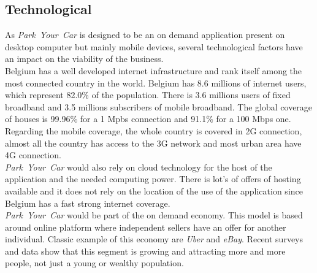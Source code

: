 \documentclass[12pt,a4paper,oneside]{book}
\newcommand{\bp}{\textit{Park~Your~Car }}
\begin{document}
\subsection{Technological}
As \bp is designed to be an on demand application present on desktop computer but mainly mobile devices, several technological factors have an impact on the viability of the business.\\

Belgium has a well developed internet infrastructure and rank itself among the most connected country in the world. Belgium has 8.6 millions of internet users, which represent 82.0\% of the population.\cite{intuser} There is 3.6 millions users of fixed broadband and 3.5 millions subscribers of mobile broadband.\cite{intsub} The global coverage of houses is 99.96\% for a 1 Mpbs connection and 91.1\% for a 100 Mbps one.\cite{fixcov} Regarding the mobile coverage, the whole country is covered in 2G connection, almost all the country has access to the 3G network and most urban area have 4G connection.\cite{mobcov}\\

\bp would also rely on cloud technology for the host of the application and the needed computing power. There is lot's of offers of hosting available and it does not rely on the location of the use of the application since Belgium has a fast strong internet coverage.\\

\bp would be part of the on demand economy. This model is based around online platform where independent sellers have an offer for another individual. Classic example of this economy are \textit{Uber} and \textit{eBay}. Recent surveys and data show that this segment is growing and attracting more and more people, not just a young or wealthy population.\cite{odegrow}
\end{document}
